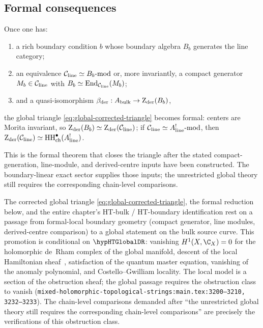 \subsection{Formal consequences}

Once one has:
\begin{enumerate}[label=(\roman*),leftmargin=1.8em]
\item a rich boundary condition $b$ whose boundary algebra $B_b$ generates the line category;
\item an equivalence $\mathcal C_{\mathrm{line}}\simeq B_b\text{-mod}$ or, more invariantly, a compact generator $M_b\in \mathcal C_{\mathrm{line}}$ with $B_b\simeq \operatorname{End}_{\mathcal C_{\mathrm{line}}}(M_b)$;
\item and a quasi-isomorphism $\beta_{\mathrm{der}}:A_{\mathrm{bulk}}\to \operatorname{Z}_{\mathrm{der}}(B_b)$,
\end{enumerate}
the global triangle \eqref{eq:global-corrected-triangle} becomes formal: centers are Morita invariant, so $\operatorname{Z}_{\mathrm{der}}(B_b)\simeq \operatorname{Z}_{\mathrm{der}}(\mathcal C_{\mathrm{line}})$; if $\mathcal C_{\mathrm{line}}\simeq A^!_{\mathrm{line}}\text{-mod}$, then $\operatorname{Z}_{\mathrm{der}}(\mathcal C_{\mathrm{line}})\simeq \operatorname{HH}^\bullet_{\mathrm{ch}}(A^!_{\mathrm{line}})$.

This is the formal theorem that closes the triangle after the stated
compact-generation, line-module, and derived-centre inputs have been
constructed. The boundary-linear exact sector supplies those inputs;
the unrestricted global theory still requires the corresponding
chain-level comparisons.

\begin{remark}
\label{rem:ht-global-de-rham-ht-bulk-boundary-line}
The corrected global triangle \eqref{eq:global-corrected-triangle},
the formal reduction below, and the entire chapter's HT-bulk /
HT-boundary identification rest on a passage from formal-local
boundary geometry (compact generator, line modules, derived-centre
comparison) to a global statement on the bulk source curve. This
promotion is conditional on $\hypHTGlobalDR$: vanishing
$H^1(X,\C_X) = 0$ for the holomorphic de~Rham complex of the
global manifold, descent of the local Hamiltonian
sheaf~\cite[\S4--5]{CG17}, satisfaction of the quantum master
equation, vanishing of the anomaly polynomial, and
Costello--Gwilliam locality. The local model is a section of the
obstruction sheaf; the global passage requires the obstruction
class to vanish
(\texttt{mixed-holomorphic-topological-strings:main.tex:3200--3210,
3232--3233}). The chain-level comparisons demanded after
``the unrestricted global theory still requires the corresponding
chain-level comparisons'' are precisely the verifications of this
obstruction class.
\end{remark}

